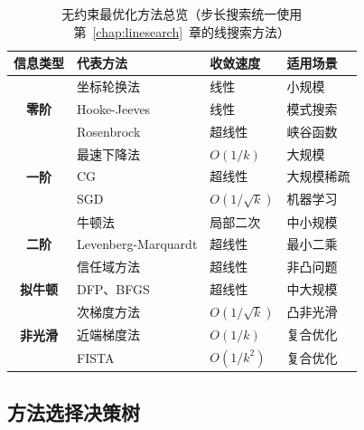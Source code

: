 \begin{table}[H]
\centering
\small
\caption{无约束最优化方法总览（步长搜索统一使用第~\ref{chap:linesearch}~章的线搜索方法）}
\setlength{\tabcolsep}{4pt}
\begin{tabular}{@{}c>{\raggedright\arraybackslash}p{3cm}>{\raggedright\arraybackslash}p{2.2cm}>{\raggedright\arraybackslash}p{4cm}@{}}
\toprule
\textbf{信息类型} & \textbf{代表方法} & \textbf{收敛速度} & \textbf{适用场景} \\
\midrule
\multirow{3}{*}{\textbf{零阶}} & 坐标轮换法 & 线性 & 小规模 \\
 & Hooke-Jeeves & 线性 & 模式搜索 \\
 & Rosenbrock & 超线性 & 峡谷函数 \\
\midrule
\multirow{3}{*}{\textbf{一阶}} & 最速下降法 & $O(1/k)$ & 大规模 \\
 & CG & 超线性 & 大规模稀疏 \\
 & SGD & $O(1/\sqrt{k})$ & 机器学习 \\
\midrule
\multirow{3}{*}{\textbf{二阶}} & 牛顿法 & 局部二次 & 中小规模 \\
 & Levenberg-Marquardt & 超线性 & 最小二乘 \\
 & 信任域方法 & 超线性 & 非凸问题 \\
\midrule
\textbf{拟牛顿} & DFP、BFGS & 超线性 & 中大规模 \\
\midrule
\multirow{3}{*}{\textbf{非光滑}} & 次梯度方法 & $O(1/\sqrt{k})$ & 凸非光滑 \\
 & 近端梯度法 & $O(1/k)$ & 复合优化 \\
 & FISTA & $O(1/k^2)$ & 复合优化 \\
\bottomrule
\end{tabular}
\end{table}

\subsection{方法选择决策树}

